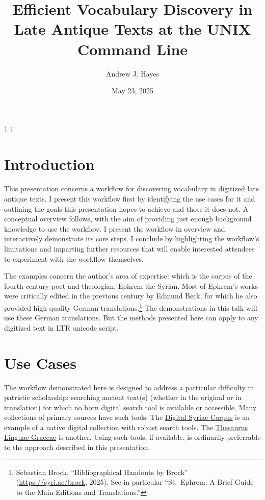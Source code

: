 \documentclass[
  letterpaper,
]{tufte-handout}
\title{Efficient Vocabulary Discovery in Late Antique Texts at the UNIX
Command Line}
\author{Andrew J. Hayes}
\date{May 23, 2025}
\begin{document}
\maketitle

\ifdefined\soulregister

\soulregister\MakeTextUppercase{1} \soulregister\MakeTextLowercase{1}
\soulregister{} \fi

\onehalfspacing

\section{Introduction}\label{introduction}

This presentation concerns a workflow for discovering vocabulary in
digitized late antique texts. I present this workflow first by
identifying the use cases for it and outlining the goals this
presentation hopes to achieve and those it does not. A conceptual
overview follows, with the aim of providing just enough background
knowledge to use the workflow. I present the workflow in overview and
interactively demonstrate its core steps. I conclude by highlighting the
workflow's limitations and imparting further resources that will enable
interested attendees to experiment with the workflow themselves.

The examples concern the author's area of expertise: which is the corpus
of the fourth century poet and theologian, Ephrem the Syrian. Most of
Ephrem's works were critically edited in the previous century by Edmund
Beck, for which he also provided high quality German
translations.\footnote{Sebastian Brock, {``Bibliographical Handouts by
  Brock''} (\url{https://syri.ac/brock}, 2025). See in particular
  ``St.~Ephrem: A Brief Guide to the Main Editions and Translations.''}
The demonstrations in this talk will use these German translations. But
the methods presented here can apply to any digitized text in LTR
unicode script.

\section{Use Cases}\label{use-cases}

The workflow demonstrated here is designed to address a particular
difficulty in patristic scholarship: searching ancient text(s) (whether
in the original or in translation) for which no born digital search tool
is available or accessible. Many collections of primary sources have
such tools. The \href{https://syriaccorpus.org/index.html}{Digital
Syriac Corpus} is an example of a native digital collection with robust
search tools. The \href{https://stephanus.tlg.uci.edu}{Thesaurus Linguae
Graecae} is another. Using such tools, if available, is ordinarily
preferrable to the approach described in this presentation.
\end{document}

